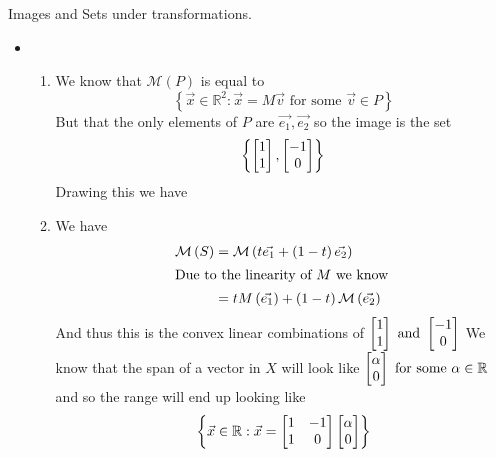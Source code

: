 \documentclass[11pt]{book}
\begin{document}
Images and Sets under transformations.

\begin{itemize}
    \item 
        \begin{enumerate}
        \item We know that $\mathcal{M}\left(P\right)$ is equal to 
            \[
            \left\{ \vec{x} \in \mathbb{R}^2: \vec{x} = M\vec{v} \text{ for some  } \vec{v} \in P \right\}
            \]
		But that the only elements of $P$ are $\vec{e_1}, \vec{e_2}$ so the image is the set
        \begin{gather*}
            \left\{ \begin{bmatrix} 1 \\ 1 \end{bmatrix}, \begin{bmatrix} -1 \\ 0 \end{bmatrix} \right\}
        \end{gather*}
        Drawing this we have
        \begin{center}
        \end{center}
        \item We have 
            \begin{align*}
                \mathcal{M}\left(S\right) &= \mathcal{M}\left(t\vec{e_1}  + \left( 1 - t \right) \vec{e_2} \right)  \\ 
                \intertext{Due to the linearity of $M$ we know }
                                          &= tM\left(\vec{e_1} \right)  + \left( 1 - t \right) \mathcal{M}\left(\vec{e_2} \right)  
            \end{align*}
            And thus this is the convex linear combinations of $\begin{bmatrix} 1 \\ 1 \end{bmatrix} \text{ and } \begin{bmatrix} -1 \\ 0 \end{bmatrix} $ 
            We know that the span of a vector in $X$ will look like $\begin{bmatrix} \alpha \\ 0 \end{bmatrix}\text{ for some  } \alpha \in \mathbb{R}$ and so the range will end up looking like
        \[
        \left\{ \vec{x} \in \mathbb{R} : \vec{x}  = \begin{bmatrix} 1 & -1 \\ 1 & 0 \end{bmatrix} \begin{bmatrix} \alpha  \\ 0 \end{bmatrix} \right\} 
\]
\end{enumerate}
\end{itemize}
\end{document}
